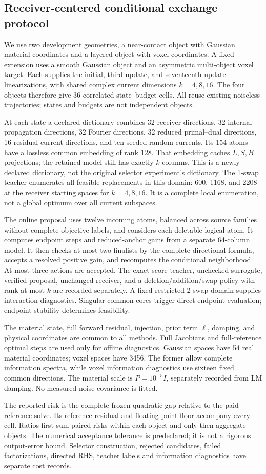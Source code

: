 \subsection{Receiver-centered conditional exchange protocol}
We use two development geometries, a near-contact object with Gaussian material coordinates and a layered object with voxel coordinates. A fixed extension uses a smooth Gaussian object and an asymmetric multi-object voxel target. Each supplies the initial, third-update, and seventeenth-update linearizations, with shared complex current dimensions $k=4,8,16$. The four objects therefore give 36 correlated state--budget cells. All reuse existing noiseless trajectories; states and budgets are not independent objects.

At each state a declared dictionary combines 32 receiver directions, 32 internal-propagation directions, 32 Fourier directions, 32 reduced primal--dual directions, 16 residual-current directions, and ten seeded random currents. Its 154 atoms have a lossless common embedding of rank 128. That embedding caches $L,S,B$ projections; the retained model still has exactly $k$ columns. This is a newly declared dictionary, not the original selector experiment's dictionary. The 1-swap teacher enumerates all feasible replacements in this domain: 600, 1168, and 2208 at the receiver starting spaces for $k=4,8,16$. It is a complete local enumeration, not a global optimum over all current subspaces.

The online proposal uses twelve incoming atoms, balanced across source families without complete-objective labels, and considers each deletable logical atom. It computes endpoint steps and reduced-anchor gains from a separate 64-column model. It then checks at most two finalists by the complete directional formula, accepts a resolved positive gain, and recomputes the conditional neighborhood. At most three actions are accepted. The exact-score teacher, unchecked surrogate, verified proposal, unchanged receiver, and a deletion/addition/swap policy with rank at most $k$ are recorded separately. A fixed restricted 2-swap domain supplies interaction diagnostics. Singular common cores trigger direct endpoint evaluation; endpoint stability determines feasibility.

The material state, full forward residual, injection, prior term $\ell$, damping, and physical coordinates are common to all methods. Full Jacobians and full-reference optimal steps are used only for offline diagnostics. Gaussian spaces have 54 real material coordinates; voxel spaces have 3456. The former allow complete information spectra, while voxel information diagnostics use sixteen fixed common directions. The material scale is $P=10^{-5}I$, separately recorded from LM damping. No measured noise covariance is fitted.

The reported risk is the complete frozen-quadratic gap relative to the paid reference solve. Its reference residual and floating-point floor accompany every cell. Ratios first sum paired risks within each object and only then aggregate objects. The numerical acceptance tolerance is predeclared; it is not a rigorous output-error bound. Selector construction, rejected candidates, failed factorizations, directed RHS, teacher labels and information diagnostics have separate cost records.
